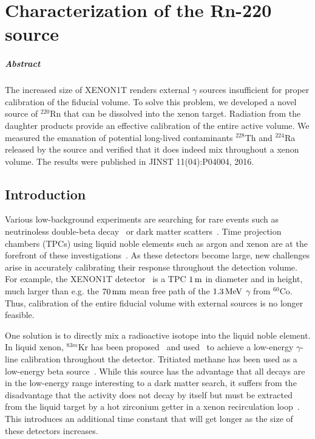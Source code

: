 
\chapter{Characterization of the Rn-220 source}\label{ch:rn220}

\paragraph{Abstract} The increased size of XENON1T renders external $\gamma$ sources insufficient for proper calibration of the fiducial volume. To solve this problem, we developed a novel source of $^{220}$Rn that can be dissolved into the xenon target. Radiation from the daughter products provide an effective calibration of the entire active volume. We measured the emanation of potential long-lived contaminants $^{228}$Th and $^{224}$Ra released by the source and verified that it does indeed mix throughout a xenon volume. The results were published in JINST 11(04):P04004,  2016.

\section{Introduction}

Various low-background experiments are searching for rare events such as neutrinoless double-beta decay~\cite{Pandola:2014naa} or dark matter scatters~\cite{Undagoitia:2015gya}. Time projection chambers (TPCs) using liquid noble elements such as argon and xenon are at the forefront of these investigations~\cite{Albert:2015eem,Aprile:2013doa,Akerib:2015rjg,Amaudruz:2014nsa,Calvo:2015uln,Agnes:2015ftt}. As these detectors become large, new challenges arise in accurately calibrating their response throughout the detection volume. For example, the XENON1T detector~\cite{Aprile:2015uzo} is a TPC $1\,\mathrm{m}$ in diameter and in height, much larger than e.g. the $70\,\mathrm{mm}$ mean free path of the $1.3\,\mathrm{MeV}$ $\gamma$ from $^{60}$Co. Thus, calibration of the entire fiducial volume with external sources is no longer feasible.

One solution is to directly mix a radioactive isotope into the liquid noble element. In liquid xenon, $^{83m}$Kr has been proposed~\cite{Hannen:2011,Manalaysay:2009yq,Kastens:2010} and used~\cite{Akerib:2013tjd} to achieve a low-energy $\gamma$-line calibration throughout the detector. Tritiated methane has been used as a low-energy beta source~\cite{Akerib:2013tjd}. While this source has the advantage that all decays are in the low-energy range interesting to a dark matter search, it suffers from the disadvantage that the activity does not decay by itself but must be extracted from the liquid target by a hot zirconium getter in a xenon recirculation loop~\cite{Akerib:2015wdi}. This introduces an additional time constant that will get longer as the size of these detectors increases.

